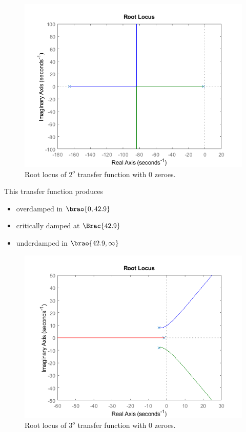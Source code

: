 \documentclass[12pt]{article}
\DeclarePairedDelimiter\brao()%
\DeclarePairedDelimiter\Brac\{\}%
\begin{document}
\begin{figure}
    \centering
    \includegraphics[width=\linewidth]{img/task03_110_rlocus.png}
    \caption{Root locus of $2^o$ transfer function with $0$ zeroes.}
    \label{fig:task rlocus 2o/0}
\end{figure}

This transfer function produces
\begin{itemize}
    \item overdamped in $\brao{0, 42.9}$
    \item critically damped at $\Brac{42.9}$
    \item underdamped in $\brao{42.9, \infty}$
\end{itemize}

\begin{figure}
    \centering
    \includegraphics[width=\linewidth]{img/task04_110_rlocus.png}
    \caption{Root locus of $3^o$ transfer function with $0$ zeroes.}
    \label{fig:task rlocus 3o/0}
\end{figure}
\end{document}
